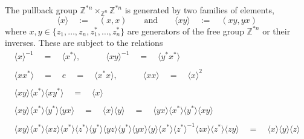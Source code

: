 \documentclass{amsbook} %
\numberwithin{section}{chapter}
\begin{document}
\begin{prop} \label{pushpres} The pullback group $\mathbb{Z}^{\ast n} \times_{\mathbb{Z}^n} \mathbb{Z}^{\ast n}$ is generated by two families of elements,
\[ \langle x \rangle \quad := \quad (x, x) \quad \quad \text{and} \quad \quad \langle xy \rangle \quad := \quad (xy, yx) \]
where $x,y \in \{z_1, \ldots, z_n, z_1^*, \ldots, z_n^*\}$ are generators of the free group $\mathbb{Z}^{\ast n}$ or their inverses. These are subject to the relations
\[ \begin{array}{c}
			\langle x \rangle^{-1} \quad = \quad \langle x^* \rangle, \quad \quad \quad \langle xy \rangle^{-1} \quad = \quad \langle y^*x^* \rangle \\
			\\
			\langle xx^* \rangle \quad = \quad e \quad = \quad \langle x^*x \rangle, \quad \quad \quad \langle xx \rangle \quad = \quad \langle x \rangle^2 \\
			\\
			\langle xy \rangle \langle x^* \rangle \langle xy^* \rangle \quad = \quad \langle x \rangle \\
			\\
			\langle xy \rangle \langle x^* \rangle \langle y^* \rangle \langle yx \rangle \quad = \quad \langle x \rangle \langle y \rangle  \quad = \quad \langle yx \rangle \langle x^* \rangle \langle y^* \rangle \langle xy \rangle \\
			\\
			\langle xy \rangle \langle x^* \rangle \langle xz \rangle \langle x^* \rangle \langle z^* \rangle \langle y^* \rangle \langle yz \rangle \langle y^* \rangle \langle yx \rangle \langle y \rangle \langle x^* \rangle \langle z^* \rangle^{-1} \langle zx \rangle \langle z^* \rangle \langle zy \rangle \quad = \quad \langle x \rangle\langle y \rangle\langle z \rangle 
		\end{array}
\]
\end{prop}
\end{document}
